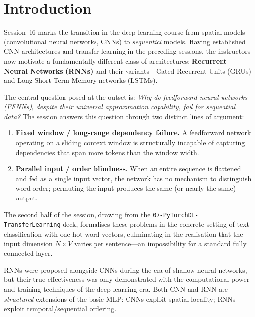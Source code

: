 \documentclass[12pt,a4paper]{article}
\begin{document}
\tableofcontents
\newpage

\section{Introduction}
\label{sec:introduction}

Session~16 marks the transition in the deep learning course from spatial
models (convolutional neural networks, CNNs) to \emph{sequential} models.
Having established CNN architectures and transfer learning in the preceding
sessions, the instructors now motivate a fundamentally different class of
architectures: \textbf{Recurrent Neural Networks (RNNs)} and their
variants---Gated Recurrent Units (GRUs) and Long Short-Term Memory networks
(LSTMs).

The central question posed at the outset is: \emph{Why do feedforward neural
networks (FFNNs), despite their universal approximation capability, fail for
sequential data?} The session answers this question through two distinct
lines of argument:

\begin{enumerate}[leftmargin=2em]
  \item \textbf{Fixed window / long-range dependency failure.} A feedforward
        network operating on a sliding context window is structurally incapable
        of capturing dependencies that span more tokens than the window width.
  \item \textbf{Parallel input / order blindness.} When an entire sequence is
        flattened and fed as a single input vector, the network has no
        mechanism to distinguish word order; permuting the input produces the
        same (or nearly the same) output.
\end{enumerate}

The second half of the session, drawing from the
\texttt{07-PyTorchDL-TransferLearning} deck, formalises these problems in
the concrete setting of text classification with one-hot word vectors,
culminating in the realisation that the input dimension $N \times V$ varies
per sentence---an impossibility for a standard fully connected layer.

\begin{keyinsight}
RNNs were proposed alongside CNNs during the era of shallow neural networks,
but their true effectiveness was only demonstrated with the computational
power and training techniques of the deep learning era.  Both CNN and RNN
are \emph{structured} extensions of the basic MLP: CNNs exploit spatial
locality; RNNs exploit temporal/sequential ordering.
\end{keyinsight}
\end{document}
